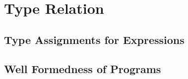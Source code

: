 \section{Type Relation}
\subsection{Type Assignments for Expressions}
\subsection{Well Formedness of Programs}


